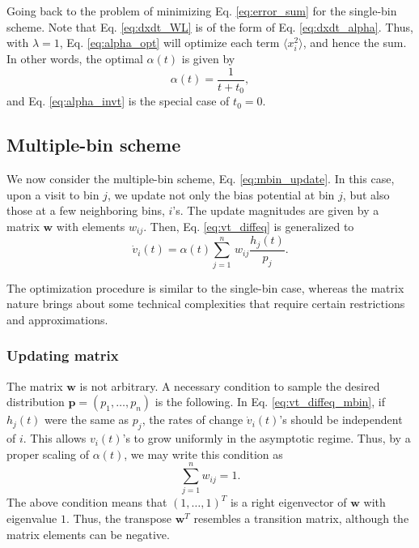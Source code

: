 \documentclass[reprint, floatfix]{revtex4-1}
\begin{document}
Going back to the problem of
minimizing Eq. \eqref{eq:error_sum}
for the single-bin scheme.
%
Note that Eq. \eqref{eq:dxdt_WL}
is of the form of Eq. \eqref{eq:dxdt_alpha}.
%
Thus, with $\lambda = 1$,
Eq. \eqref{eq:alpha_opt}
will optimize each term $\langle x_i^2 \rangle$,
and hence the sum.
%
In other words, the optimal $\alpha(t)$
is given by
\begin{equation}
\alpha(t)
=
\frac{    1     }
     {  t + t_0 }
,
\label{eq:alpha_invt1}
\end{equation}
and Eq. \eqref{eq:alpha_invt}
is the special case of $t_0 = 0$.



\subsection{\label{sec:multiple-bin}
Multiple-bin scheme}



We now consider the multiple-bin scheme,
Eq. \eqref{eq:mbin_update}.
%
In this case,
upon a visit to bin $j$,
we update not only the bias potential at bin $j$,
but also those at a few neighboring bins, $i$'s.
%
The update magnitudes are given by a matrix
$\mathbf w$
with elements $w_{ij}$.
%
Then, Eq. \eqref{eq:vt_diffeq} is generalized to
\begin{equation}
  \dot v_i(t)
  =
  \alpha(t) \sum_{j=1}^n \, w_{ij} \frac{ h_j(t) } { p_j }.
  \label{eq:vt_diffeq_mbin}
\end{equation}


The optimization procedure is similar to the single-bin case,
whereas the matrix nature brings about
some technical complexities that require
certain restrictions and approximations.



\subsubsection{\label{sec:updating-matrix}
Updating matrix}



The matrix $\mathbf w$ is not arbitrary.
%
A necessary condition to sample
the desired distribution
$\mathbf p = (p_1, \dots, p_n)$
is the following.
%
In Eq. \eqref{eq:vt_diffeq_mbin},
if $h_j(t)$ were the same as $p_j$,
the rates of change $\dot v_i(t)$'s
should be independent of $i$.
%
This allows $v_i(t)$'s to grow uniformly
in the asymptotic regime.
%
Thus, by a proper scaling of $\alpha(t)$,
we may write this condition as
%
\begin{equation}
  \sum_{j = 1}^n w_{ij} = 1.
  \label{eq:w_sumj}
\end{equation}
%
The above condition means that $(1, \dots, 1)^T$
is a right eigenvector of $\mathbf w$
with eigenvalue $1$.
%
Thus, the transpose $\mathbf w^T$
resembles a transition matrix,
although the matrix elements can be negative.
\end{document}
